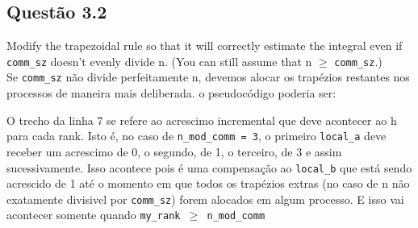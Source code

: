 

\subsection{Questão 3.2}

Modify the trapezoidal rule so that it will correctly estimate the integral even if \texttt{comm\_sz} doesn’t evenly divide n. (You can still assume that n $\geq$ \texttt{comm\_sz}.)\\

Se \texttt{comm\_sz} não divide perfeitamente n, devemos alocar os trapézios restantes nos processos de maneira mais deliberada. o pseudocódigo poderia ser:



O trecho da linha 7 se refere ao acrescimo incremental que deve acontecer ao h para cada rank. Isto é, no caso de \texttt{n\_mod\_comm = 3}, o primeiro \texttt{local\_a} deve receber um acrescimo de 0, o segundo, de 1, o terceiro, de 3 e assim sucessivamente. Isso acontece pois é uma compensação ao \texttt{local\_b} que está sendo acrescido de 1 até o momento em que todos os trapézios extras (no caso de n não exatamente divisivel por \texttt{comm\_sz}) forem alocados em algum processo. E isso vai acontecer somente quando \texttt{my\_rank $\geq$ n\_mod\_comm}

